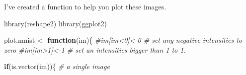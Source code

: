 \documentclass[
]{book}
\newenvironment{Shaded}{\begin{snugshade}}{\end{snugshade}}
\newcommand{\CommentTok}[1]{\textcolor[rgb]{0.56,0.35,0.01}{\textit{#1}}}
\newcommand{\ControlFlowTok}[1]{\textcolor[rgb]{0.13,0.29,0.53}{\textbf{#1}}}
\newcommand{\DecValTok}[1]{\textcolor[rgb]{0.00,0.00,0.81}{#1}}
\newcommand{\FunctionTok}[1]{\textcolor[rgb]{0.00,0.00,0.00}{#1}}
\newcommand{\NormalTok}[1]{#1}
\newcommand{\OtherTok}[1]{\textcolor[rgb]{0.56,0.35,0.01}{#1}}
\newcommand{\SpecialCharTok}[1]{\textcolor[rgb]{0.00,0.00,0.00}{#1}}
\theoremstyle{definition}
\theoremstyle{definition}
\theoremstyle{definition}
\theoremstyle{definition}
\theoremstyle{remark}
\begin{document}
\begin{Shaded}
\end{Shaded}

I've created a function to help you plot these images.

\begin{Shaded}
\begin{Highlighting}[]
\FunctionTok{library}\NormalTok{(reshape2)}
\FunctionTok{library}\NormalTok{(ggplot2)}


\NormalTok{plot.mnist }\OtherTok{\textless{}{-}} \ControlFlowTok{function}\NormalTok{(im)\{}
  \CommentTok{\#im[im\textless{}0]\textless{}{-}0 \# set any negative intensities to zero}
  \CommentTok{\#im[im\textgreater{}1]\textless{}{-}1 \# set an intensities bigger than 1 to 1.}
  
  
  \ControlFlowTok{if}\NormalTok{(}\FunctionTok{is.vector}\NormalTok{(im))\{ }\CommentTok{\# a single image}
    

\end{Highlighting}
\end{Shaded}
\end{document}
